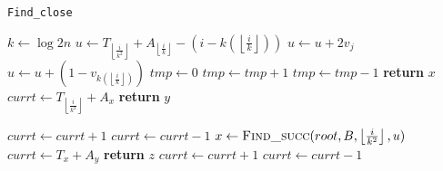 \documentclass{article}
\begin{document}
    \begin{algorithm}
    \caption{\texttt{Find\_close}}\label{findclose}
    \begin{algorithmic}[1]
        \State $k\gets\log{2n}$
        \State $u\gets T_{\left\lfloor{\frac{i}{k^2}}\right\rfloor}+A_{\left\lfloor{\frac{i}{k}}\right\rfloor}-(i-k(\left\lfloor{\frac{i}{k}}\right\rfloor))$
            \State $u\gets u+2v_j$
        \EndFor
        \State $u\gets u+(1-v_{k(\left\lfloor{\frac{i}{k}}\right\rfloor)})$
        \State
        \State $tmp\gets 0$
                \State $tmp\gets tmp+1$
            \Else  
                \State $tmp\gets tmp-1$
            \EndIf
                \State \textbf{return} $x$
            \EndIf
        \EndFor
        \State
                \State $currt\gets T_{\left\lfloor{\frac{i}{k^2}}\right\rfloor}+A_x$
                        \State \textbf{return} $y$
                    \EndIf
    \end{algorithmic}
    \end{algorithm}
    \begin{algorithm}
    \begin{algorithmic}[1]
                        \State $currt\gets currt+1$
                    \EndIf
                        \State $currt\gets currt-1$
                    \EndIf
                \EndFor
            \EndIf
        \EndFor
        \State
        \State $x\gets \Call{Find\_succ}{root,B,\left\lfloor{\frac{i}{k^2}}\right\rfloor,u}$ 
                \State $currt\gets T_x+A_y$
                        \State \textbf{return} $z$
                    \EndIf
                        \State $currt\gets currt+1$
                    \EndIf
                        \State $currt\gets currt-1$
                    \EndIf
                \EndFor
            \EndIf
        \EndFor
    \EndProcedure
    \end{algorithmic}
    \end{algorithm}
    
\end{document}
